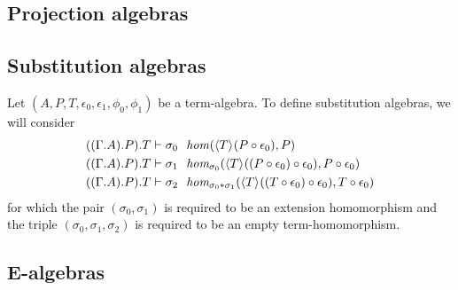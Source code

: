 \begin{comment}
\subsubsection{The compatibility of weakening with itself}
To express the compatibility of weakening with itself, we must fill in the
following diagram:
\begin{equation*}
\begin{tikzcd}
\ctxwk{P}{{P}{P}}
  \ar{r}{\ctxwk{P}{\omega_0}}
  \ar{d}[swap]{\ctxwk{{P}{P}}{\omega_0}}
& \ctxwk{P}{\jcomp{}{\epsilon_0}{P}}
  \ar{d}{\omega_1}
  \\
\ctxwk{{P}{P}}{\jcomp{}{\epsilon_0}{P}}
  \ar[densely dotted]{r}
& \jcomp{}{\omega_0}{\jcomp{}{\epsilon_0}{\jcomp{}{\epsilon_0}{P}}}
\end{tikzcd}
\end{equation*}
\end{comment}

\subsection{Projection algebras}

\subsection{Substitution algebras}

Let $(A,P,T,\epsilon_0,\epsilon_1,\phi_0,\phi_1)$ be a term-algebra. To define
substitution algebras, we will consider
\begin{align*}
\jhom*
  {{{{\Gamma}{A}}{P}}{T}}
  {\ctxwk{T}{\jcomp{}{\epsilon_0}{P}}}
  {P}
  {\sigma_0}
  \\
\jfhom*
  {{{{\Gamma}{A}}{P}}{T}}
  {\ctxwk{T}{\jcomp{}{\epsilon_0}{P}}}
  {P}
  {\sigma_0}
  {\ctxwk{T}{\jcomp{}{\epsilon_0}{\jcomp{}{\epsilon_0}{P}}}}
  {\jcomp{}{\epsilon_0}{P}}
  {\sigma_1}
  \\
\jfhom*
  {{{{\Gamma}{A}}{P}}{T}}
  { \ctxext
      {\ctxwk{T}{\jcomp{}{\epsilon_0}{P}}}
      {\ctxwk{T}{\jcomp{}{\epsilon_0}{\jcomp{}{\epsilon_0}{P}}}}
    }
  {\ctxext{P}{\jcomp{}{\epsilon_0}{P}}}
  {\jvcomp{}{\sigma_0}{\sigma_1}}
  {\ctxwk{T}{\jcomp{}{\epsilon_0}{\jcomp{}{\epsilon_0}{T}}}}
  {\jcomp{}{\epsilon_0}{T}}
  {\sigma_2}
\end{align*}
for which the pair $(\sigma_0,\sigma_1)$ is required to be an extension
homomorphism and the triple $(\sigma_0,\sigma_1,\sigma_2)$ is required to
be an empty term-homomorphism.

\subsection{E-algebras}

